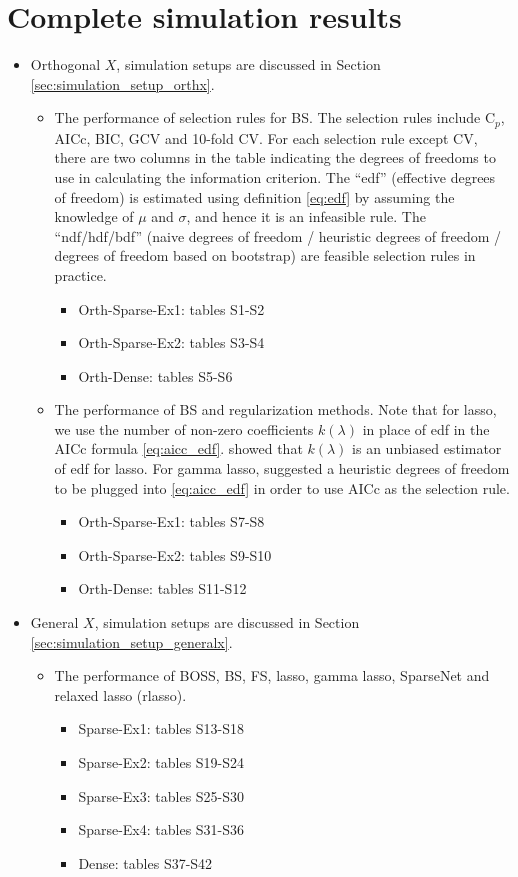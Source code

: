 \section{Complete simulation results}
\begin{itemize}
	\item Orthogonal $X$, simulation setups are discussed in Section \ref{sec:simulation_setup_orthx}. 
	\begin{itemize}
		\item The performance of selection rules for BS. The selection rules include C$_p$, AICc, BIC, GCV and 10-fold CV. For each selection rule except CV, there are two columns in the table indicating the degrees of freedoms to use in calculating the information criterion. The ``edf'' (effective degrees of freedom) is estimated using definition \eqref{eq:edf} by assuming the knowledge of $\mu$ and $\sigma$, and hence it is an infeasible rule. The ``ndf/hdf/bdf'' (naive degrees of freedom /  heuristic degrees of freedom / degrees of freedom based on bootstrap) are feasible selection rules in practice. 
		\begin{itemize}
			\item Orth-Sparse-Ex1: tables S1-S2
			\item Orth-Sparse-Ex2: tables S3-S4
			\item Orth-Dense: tables S5-S6
		\end{itemize}
		\item The performance of BS and regularization methods. Note that for lasso, we use the number of non-zero coefficients $k(\lambda)$ in place of edf in the AICc formula \eqref{eq:aicc_edf}.  showed that $k(\lambda)$ is an unbiased estimator of edf for lasso. For gamma lasso,  suggested a heuristic degrees of freedom to be plugged into \eqref{eq:aicc_edf} in order to use AICc as the selection rule.
		\begin{itemize}
			\item Orth-Sparse-Ex1: tables S7-S8
			\item Orth-Sparse-Ex2: tables S9-S10
			\item Orth-Dense: tables S11-S12
		\end{itemize}
	\end{itemize}
	\item General $X$, simulation setups are discussed in Section \ref{sec:simulation_setup_generalx}. 
	\begin{itemize}
		\item The performance of BOSS, BS, FS, lasso, gamma lasso, SparseNet and relaxed lasso (rlasso).
		\begin{itemize}
			\item Sparse-Ex1: tables S13-S18
			\item Sparse-Ex2: tables S19-S24
			\item Sparse-Ex3: tables S25-S30
			\item Sparse-Ex4: tables S31-S36
			\item Dense: tables S37-S42
		\end{itemize}
	\end{itemize}
\end{itemize}

